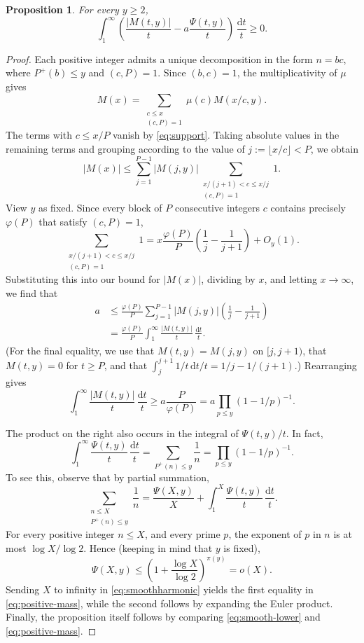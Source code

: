 \documentclass[11pt]{amsart}
\newtheorem{proposition}[theorem]{Proposition}
\theoremstyle{remark}
\newcommand{\dt}{\,\frac{\mathrm{d}t}{t}}
\begin{document}
\begin{proposition}\label{prop:comparison}
For every $y\ge2$,
\begin{equation}\label{eq:comparison}
\int_1^\infty
\left(\frac{|M(t,y)|}t-a\frac{\Psi(t,y)}t\right)\dt\ge0.
\end{equation}
\end{proposition}
\begin{proof} Each positive integer admits a unique decomposition in the form $n=bc$, where
$P^+(b)\le y$ and $(c,P)=1$. Since $(b,c)=1$, the multiplicativity
of $\mu$ gives
\[
M(x)=\sum_{\substack{c\le x\\(c,P)=1}}\mu(c)M(x/c,y).
\]
The terms with $c\le x/P$ vanish by \eqref{eq:support}. Taking
absolute values in the remaining terms and grouping according to the value of
$j:=\lfloor x/c\rfloor<P$, we obtain
\[
|M(x)|\le
\sum_{j=1}^{P-1}|M(j,y)|
\sum_{\substack{x/(j+1)<c\le x/j\\(c,P)=1}}1.
\]
View $y$ as fixed. Since every block of $P$ consecutive integers $c$ contains precisely $\varphi(P)$ that satisfy $(c,P)=1$,
\[
\sum_{\substack{x/(j+1)<c\le x/j\\(c,P)=1}}1
=x\frac{\varphi(P)}P\left(\frac1j-\frac1{j+1}\right)+O_y(1).
\]
Substituting this into our bound for $|M(x)|$, dividing by $x$,
and letting $x\to\infty$, we find that
\[
\begin{aligned}
a
&\le\frac{\varphi(P)}P
 \sum_{j=1}^{P-1}|M(j,y)|\left(\frac1j-\frac1{j+1}\right)\\
&=\frac{\varphi(P)}P
 \int_1^\infty\frac{|M(t,y)|}t\dt.
\end{aligned}
\]
(For the final equality, we use that $M(t,y)=M(j,y)$ on $[j,j+1)$, that $M(t,y)=0$ for $t\ge P$, and that $\int_j^{j+1} 1/t \,\mathrm{d}t/t = 1/j - 1/(j+1)$.) Rearranging gives
\begin{equation}\label{eq:smooth-lower}
\int_1^\infty\frac{|M(t,y)|}t\dt
\ge a\frac P{\varphi(P)}
=a\prod_{p\le y}(1-1/p)^{-1}.
\end{equation}

The product on the right also occurs in the integral of
$\Psi(t,y)/t$. In fact,
\begin{equation}\label{eq:positive-mass}
\int_1^\infty\frac{\Psi(t,y)}t\dt
=\sum_{P^+(n)\le y}\frac1n
=\prod_{p\le y}(1-1/p)^{-1}.
\end{equation}
To see this, observe that by partial summation,
\begin{equation}\label{eq:smoothharmonic}
\sum_{\substack{n\le X\\P^+(n)\le y}}\frac1n
=\frac{\Psi(X,y)}X+\int_1^X\frac{\Psi(t,y)}t\dt.
\end{equation}
For every positive integer $n\le X$, and every prime $p$, the exponent of $p$ in $n$ is at most $\log{X}/\log{2}$. Hence (keeping in mind that $y$ is fixed),
\[
\Psi(X,y)\le
\left(1+\frac{\log X}{\log2}\right)^{\pi(y)}=o(X).
\]
Sending $X$ to infinity in \eqref{eq:smoothharmonic} yields the first equality in
\eqref{eq:positive-mass}, while the second follows by expanding the Euler product. Finally, the proposition itself follows by comparing \eqref{eq:smooth-lower} and \eqref{eq:positive-mass}.\end{proof}
\end{document}
